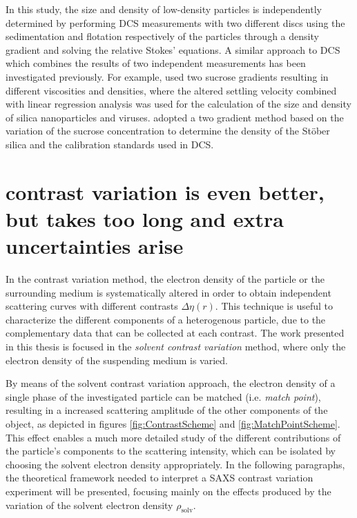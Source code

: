 In this study, the size and density of low-density particles is independently determined by performing DCS measurements with two different discs using the sedimentation and flotation respectively of the particles through a density gradient and solving the relative Stokes' equations. A similar approach to DCS which combines the results of two independent measurements has been investigated previously. For example, \cite{neumann_new_2013} used two sucrose gradients resulting in different viscosities and densities, where the altered settling velocity combined with linear regression analysis was used for the calculation of the size and density of silica nanoparticles and viruses. \cite{bell_emerging_2012} adopted a two gradient method based on the variation of the sucrose concentration to determine the density of the St\"ober silica and the calibration standards used in DCS.

\section{contrast variation is even better, but takes too long and extra uncertainties arise}

In the contrast variation method, the electron density of the particle or the surrounding medium is systematically altered in order to obtain independent scattering curves with different contrasts $\Delta \eta (r)$. This technique is useful to characterize the different components of a heterogenous particle, due to the complementary data that can be collected at each contrast. The work presented in this thesis is focused in the \emph{solvent contrast variation} method, where only the electron density of the suspending medium is varied.

By means of the solvent contrast variation approach, the electron density of a single phase of the investigated particle can be matched (i.e. \emph{match point}), resulting in a increased scattering amplitude of the other components of the object, as depicted in figures \ref{fig:ContrastScheme} and \ref{fig:MatchPointScheme}. This effect enables a much more detailed study of the different contributions of the particle's components to the scattering intensity, which can be isolated by choosing the solvent electron density appropriately. In the following paragraphs, the theoretical framework needed to interpret a SAXS contrast variation experiment will be presented, focusing mainly on the effects produced by the variation of the solvent electron density $\rho_{\text{solv}}$.


